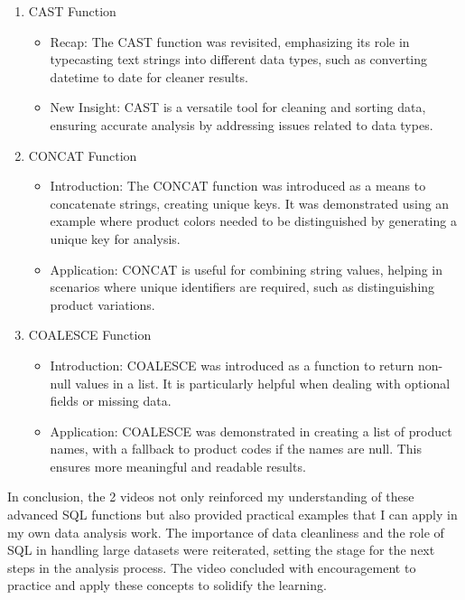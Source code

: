 \documentclass[]{article}
\begin{document}
\begin{enumerate}
  \item CAST Function
        \begin{itemize}
          \item Recap: The CAST function was revisited, emphasizing its role in typecasting text strings into different data types, such as converting datetime to date for cleaner results.
          \item New Insight: CAST is a versatile tool for cleaning and sorting data, ensuring accurate analysis by addressing issues related to data types.
        \end{itemize}
  \item CONCAT Function
        \begin{itemize}
          \item Introduction: The CONCAT function was introduced as a means to concatenate strings, creating unique keys. It was demonstrated using an example where product colors needed to be distinguished by generating a unique key for analysis.
          \item Application: CONCAT is useful for combining string values, helping in scenarios where unique identifiers are required, such as distinguishing product variations.
        \end{itemize}
  \item COALESCE Function
        \begin{itemize}
          \item Introduction: COALESCE was introduced as a function to return non-null values in a list. It is particularly helpful when dealing with optional fields or missing data.
          \item Application: COALESCE was demonstrated in creating a list of product names, with a fallback to product codes if the names are null. This ensures more meaningful and readable results.
        \end{itemize}
\end{enumerate}

In conclusion, the 2 videos not only reinforced my understanding of these advanced SQL functions but also provided practical examples that I can apply in my own data analysis work. The importance of data cleanliness and the role of SQL in handling large datasets were reiterated, setting the stage for the next steps in the analysis process. The video concluded with encouragement to practice and apply these concepts to solidify the learning.
\end{document}
